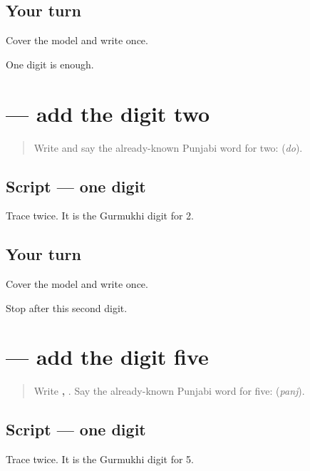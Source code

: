 \subsection*{Your turn}
Cover the model and write \textbf{} once.

\begin{tcolorbox}[breakable,colback=teal!4,colframe=teal!35!black,title={Before you move on}]
One digit is enough.
\end{tcolorbox}
\section[\texorpdfstring{\pa{੨} (two)}{੨ (two)}]{ — add the digit two}

\label{lesson:PA-W07-digit-two}



\begin{quote}
Write \textbf{} and say the already-known Punjabi word for two: \textbf{} (\emph{do}).
\end{quote}

\subsection*{Script — one digit}
Trace \textbf{} twice. It is the Gurmukhi digit for 2.

\subsection*{Your turn}
Cover the model and write \textbf{} once.

\begin{tcolorbox}[breakable,colback=teal!4,colframe=teal!35!black,title={Before you move on}]
Stop after this second digit.
\end{tcolorbox}
\section[\texorpdfstring{\pa{੫} (five)}{੫ (five)}]{ — add the digit five}

\label{lesson:PA-W07-digit-five}



\begin{quote}
Write \textbf{, }. Say the already-known Punjabi word for five: \textbf{} (\emph{panj}).
\end{quote}

\subsection*{Script — one digit}
Trace \textbf{} twice. It is the Gurmukhi digit for 5.

